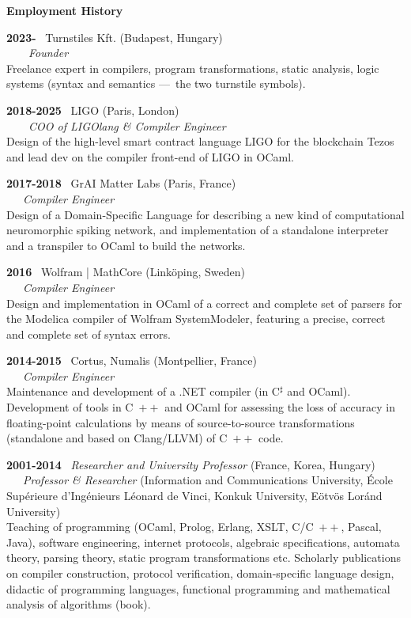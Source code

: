 \documentclass[a4paper,11pt]{article}
\newcommand{\cpp}{\mbox{C \hspace*{-2.5mm} \raise 0.7mm \hbox{${\scriptscriptstyle ++}$}}}
\begin{document}
\smallskip
\noindent\textbf{\large Employment History}
\bigskip

\noindent\textbf{2023-} \ \textsf{Turnstiles Kft.} (Budapest,
Hungary)\\ \ \ \ \ \emph{Founder}\\
Freelance expert in compilers, program transformations, static
analysis, logic systems (syntax and semantics ---~the two turnstile
symbols).

\bigskip

\noindent\textbf{2018-2025} \ \textsf{LIGO} (Paris,
London)\\ \ \ \ \ \emph{COO of LIGOlang \& Compiler Engineer}\\ Design
of the high-level smart contract language LIGO for the blockchain
Tezos and lead dev on the compiler front-end of LIGO in OCaml.

\bigskip

\noindent\textbf{2017-2018} \ \textsf{GrAI Matter Labs} (Paris,
France)\\ \ \ \ \emph{Compiler Engineer}\\ Design of a Domain-Specific
Language for describing a new kind of computational
neuromorphic spiking network, and implementation of a standalone
interpreter and a transpiler to OCaml to build the networks.

\bigskip

\noindent\textbf{2016} \ \textsf{Wolfram | MathCore}
(Link\"oping, Sweden)\\ \ \ \ \emph{Compiler Engineer}\\ Design and
implementation in OCaml of a correct and complete set of parsers
for the Modelica compiler of Wolfram SystemModeler, featuring a
precise, correct and complete set of syntax errors.

\bigskip

\noindent\textbf{2014-2015} \ \textsf{Cortus}, \textsf{Numalis}
(Montpellier, France)\\ \ \ \ \emph{Compiler Engineer}\\ Maintenance
and development of a .NET compiler (in C$^\sharp$ and
OCaml). Development of tools in \cpp{} and OCaml for assessing the
loss of accuracy in floating-point calculations by means of
source\hyp{}to\hyp{}source transformations (standalone and based on
Clang/LLVM) of \cpp{} code.

\bigskip

\noindent\textbf{2001-2014} \ \textsf{\emph{Researcher and University
  Professor}} (France, Korea, Hungary)\\ \ \ \ \emph{Professor \&
Researcher} (Information and Communications University, École
Supérieure d'Ingénieurs Léonard de Vinci, Konkuk University, Eötvös
Loránd University)\\ Teaching of programming (OCaml, Prolog, Erlang,
XSLT, C/\cpp, Pascal, Java), software engineering, internet protocols,
algebraic specifications, automata theory, parsing theory, static
program transformations etc. Scholarly publications on compiler
construction, protocol verification, domain\hyp{}specific language
design, didactic of programming languages, functional programming and
mathematical analysis of algorithms (book).
\end{document}
